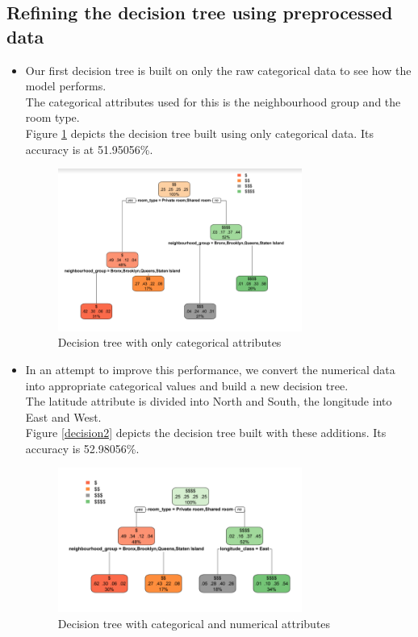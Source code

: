 \documentclass{sig-alternate}
\begin{document}
	\subsection{Refining the decision tree using preprocessed data}
	\begin{itemize}
		\item Our first decision tree is built on only the raw categorical data to see how the model performs.\\
		The categorical attributes used for this is the neighbourhood group and the room type. \\
		Figure \ref{decision1} depicts the decision tree built using only categorical data. Its accuracy is at 51.95056\%.
		\begin{figure}[ht]
			\includegraphics[width=8cm]{decision1.PNG}
			\caption{Decision tree with only categorical attributes}
			\label{decision1}
			\centering
		\end{figure}
	\item In an attempt to improve this performance, we convert the numerical data into appropriate categorical values and build a new decision tree.\\
	The latitude attribute is divided into North and South, the longitude into East and West.\\
	Figure \ref{decision2} depicts the decision tree built with these additions. Its accuracy is 52.98056\%.
	\begin{figure}[ht]
		\includegraphics[width=8cm]{decision2.PNG}
		\caption{Decision tree with categorical and numerical attributes}

\end{figure}
\end{itemize}
\end{document}
